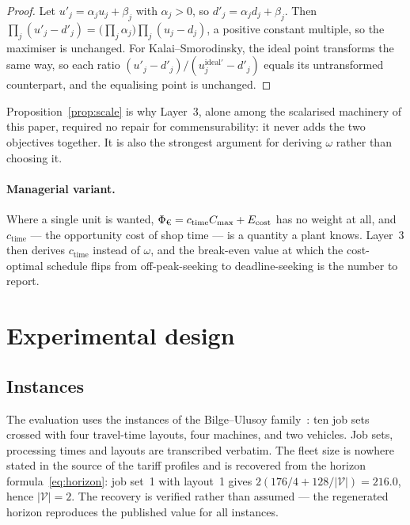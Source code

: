\documentclass[preprint, 3p, review, 12pt]{elsarticle}
\providecommand{\euro}{\texteuro}
\theoremstyle{definition}
\begin{document}
\begin{proof}
Let $u'_j=\alpha_j u_j+\beta_j$ with $\alpha_j>0$, so $d'_j=\alpha_j d_j+\beta_j$. Then
$\prod_j (u'_j-d'_j)=\big(\prod_j\alpha_j\big)\prod_j(u_j-d_j)$, a positive constant multiple,
so the maximiser is unchanged. For Kalai--Smorodinsky, the ideal point transforms the same
way, so each ratio $(u'_j-d'_j)/(u^{\mathrm{ideal}\prime}_j-d'_j)$ equals its untransformed
counterpart, and the equalising point is unchanged.
\end{proof}

Proposition~\ref{prop:scale} is why Layer~3, alone among the scalarised machinery of this
paper, required no repair for commensurability: it never adds the two objectives together.
It is also the strongest argument for deriving $\omega$ rather than choosing it.

\paragraph{Managerial variant.} Where a single unit is wanted,
$\Phi_{\text{\euro}} = c_{\mathrm{time}}C_{\max} + E_{\mathrm{cost}}$ has no weight at all,
and $c_{\mathrm{time}}$ --- the opportunity cost of shop time --- is a quantity a plant knows.
Layer~3 then derives $c_{\mathrm{time}}$ instead of $\omega$, and the break-even value at
which the cost-optimal schedule flips from off-peak-seeking to deadline-seeking is the number
to report.

\section{Experimental design}
\label{sec:exp}

\subsection{Instances}
The evaluation uses the  instances of the Bilge--Ulusoy
family~\citep{bilge1995}: ten job sets crossed with four travel-time layouts, four machines,
and two vehicles. Job sets, processing times and layouts are transcribed verbatim. The fleet
size is nowhere stated in the source of the tariff profiles and is recovered from the horizon
formula~\eqref{eq:horizon}: job set~1 with layout~1 gives
$2(176/4+128/|\mathcal{V}|)=216.0$, hence $|\mathcal{V}|=2$. The recovery is verified rather
than assumed --- the regenerated horizon reproduces the published value for all
 instances.
\end{document}
